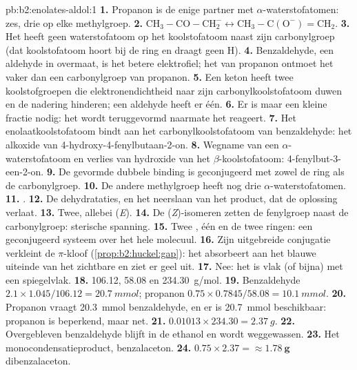 \begin{solution}{pb:b2:enolates-aldol:1}
\textbf{1.} Propanon is de enige partner met $\alpha$-waterstofatomen: zes, drie op elke methylgroep.
\textbf{2.} $\mathrm{CH_3{-}CO{-}CH_2^-} \leftrightarrow \mathrm{CH_3{-}C(O^-){=}CH_2}$.
\textbf{3.} Het heeft geen waterstofatoom op het koolstofatoom naast zijn carbonylgroep (dat koolstofatoom hoort bij de ring en
draagt geen H).
\textbf{4.} Benzaldehyde, een aldehyde in overmaat, is het betere elektrofiel; het  van propanon ontmoet het
vaker dan een carbonylgroep van propanon.
\textbf{5.} Een keton heeft twee koolstofgroepen die elektronendichtheid naar zijn carbonylkoolstofatoom duwen en
de nadering hinderen; een aldehyde heeft er één.
\textbf{6.} Er is maar een kleine fractie  nodig: het wordt teruggevormd naarmate het reageert.
\textbf{7.} Het enolaatkoolstofatoom bindt aan het carbonylkoolstofatoom van benzaldehyde: het alkoxide van
4-hydroxy-4-fenylbutaan-2-on.
\textbf{8.} Wegname van een $\alpha$-waterstofatoom en verlies van hydroxide van het $\beta$-koolstofatoom: 4-fenylbut-3-een-2-on.
\textbf{9.} De gevormde dubbele binding is geconjugeerd met zowel de ring als de carbonylgroep.
\textbf{10.} De andere methylgroep heeft nog drie $\alpha$-waterstofatomen.
\textbf{11.} .
\textbf{12.} De dehydrataties, en het neerslaan van het product, dat de oplossing verlaat.
\textbf{13.} Twee, allebei (\textit{E}).
\textbf{14.} De (\textit{Z})-isomeren zetten de fenylgroep naast de carbonylgroep: sterische spanning.
\textbf{15.} Twee , één  en de twee ringen: een geconjugeerd systeem over het hele molecuul.
\textbf{16.} Zijn uitgebreide conjugatie verkleint de $\pi$-kloof (\cref{prop:b2:huckel:gap}): het absorbeert aan het
blauwe uiteinde van het zichtbare en ziet er geel uit.
\textbf{17.} Nee: het is vlak (of bijna) met een spiegelvlak.
\textbf{18.} 106.12, 58.08 en \qty{234.30}{g/mol}.
\textbf{19.} Benzaldehyde $2.1 \times 1.045/106.12 = \qty{20.7}{mmol}$; propanon $0.75 \times
0.7845/58.08 = \qty{10.1}{mmol}$.
\textbf{20.} Propanon vraagt \qty{20.3}{mmol} benzaldehyde, en er is \qty{20.7}{mmol} beschikbaar:
propanon is beperkend, maar net.
\textbf{21.} $0.01013 \times 234.30 = \qty{2.37}{g}$.
\textbf{22.} Overgebleven benzaldehyde blijft in de ethanol en wordt weggewassen.
\textbf{23.} Het monocondensatieproduct, benzalaceton.
\textbf{24.} $0.75 \times 2.37 = \boldsymbol{\approx \qty{1.78}{g}}$ dibenzalaceton.
\end{solution}
